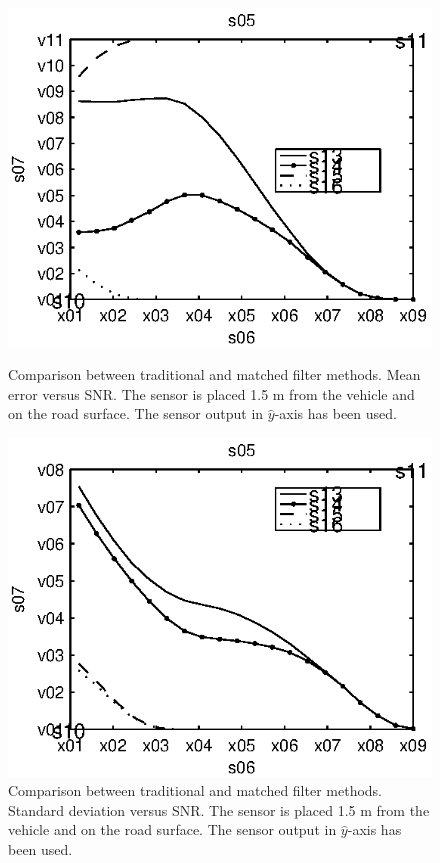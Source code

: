 \begin{subfigures}
\begin{figure}[!tbhf]
  \centering
  \begin{minipage}{0.45\linewidth}
  \centering
  
   \includegraphics[width=\linewidth]{images/mean_error_y}
  \caption[Time difference, method comparison. Mean error. $\hat{y}$-axis]{Comparison between traditional and matched filter methods. Mean error versus SNR. The sensor is placed 1.5 m from the vehicle and on the road surface. The sensor output in $\hat{y}$-axis has been used.}
  \label{fig:comp_mean_y}
  \end{minipage}\hfill
  \begin{minipage}{0.45\linewidth}
   \centering
   
   \includegraphics[width=\linewidth]{images/std_error_y}
  \caption[Time difference, method comparison. Error standard deviation. $\hat{y}$-axis]{Comparison between traditional and matched filter methods. Standard deviation versus SNR. The sensor is placed 1.5 m from the vehicle and on the road surface. The sensor output in $\hat{y}$-axis has been used.}
  \label{fig:comp_std_y}
  \end{minipage}
 \end{figure}
\end{subfigures}

